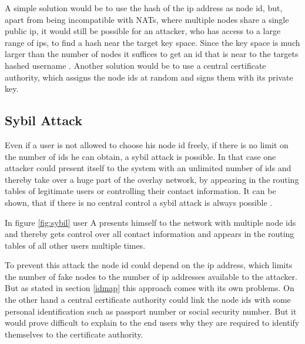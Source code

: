 \documentclass[a4paper,10pt]{article}
\begin{document}
A simple solution would be to use the hash of the ip address as node id, but,
apart from being incompatible with NATs, where multiple nodes share a single
public ip,
it would still be possible for an attacker, who has access to a large range of
ips, to find a hash near the target key space. Since the key space
is much larger than the number of nodes it suffices to get an id that is near to
the targets hashed username \cite{touceda}.
Another solution would be to use a central certificate authority, which assigns
the node ids at random and signs them with its private key.


\subsection{Sybil Attack}
\label{sybil}

Even if a user is not allowed to choose his node id freely, if there is no limit
on the number of ids he can obtain, a sybil attack is possible.
In that case one attacker could present itself to the system with an unlimited
number of ids and thereby take over a huge part of the overlay network, by
appearing in the routing tables of legitimate users or controlling their contact
information.
It can be shown, that if there is no central control a sybil attack is always
possible \cite{douceur, touceda}.

In figure \ref{fig:sybil} user A presents himself to the network with multiple
node ids and thereby gets control over all contact information and appears in
the routing tables of all other users multiple times.

To prevent this attack the node id could depend on the ip address, which limits
the number of fake nodes to the number of ip addresses available to the
attacker. But
as stated in section \ref{idmap} this approach comes with its own problems. On
the other hand a central certificate authority could link the
node ids with some personal identification such as passport number or social
security number. But it would prove difficult to explain to the end users
why they are required to identify themselves to the certificate authority.
\end{document}
